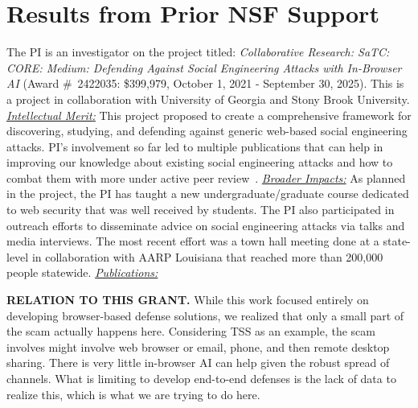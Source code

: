 \section{Results from Prior NSF Support}


The PI is an investigator on the project titled: \emph{Collaborative Research: SaTC: CORE: Medium: Defending Against Social Engineering Attacks with In-Browser AI} (Award \#~2422035: \$399,979, October 1, 2021 - September 30, 2025). 
This is a project in collaboration with University of Georgia and Stony Brook University. 
\underline{\emph{Intellectual Merit:}} This project proposed to create a comprehensive framework for discovering, studying, and defending against generic web-based social engineering attacks. PI's involvement so far led to multiple publications that can help in improving our knowledge about existing social engineering attacks and how to combat them with more under active peer review~\cite{ozen2024senet}. \underline{\emph{Broader Impacts:}} As planned in the project, the PI has taught a new undergraduate/graduate course dedicated to web security that was well received by students. The PI also participated in outreach efforts to disseminate advice on social engineering attacks via talks and media interviews. The most recent effort was a town hall meeting done at a state-level in collaboration with AARP Louisiana that reached more than 200,000 people statewide. \underline{\emph{Publications:}} ~\cite{LiuPVP23,SubramaniMSVP22,ChaliseNV22,AcharyaV22,honeytweets,cframe_oakland}


\textbf{RELATION TO THIS GRANT.} While this work focused entirely on developing browser-based defense solutions, we realized that only a small part of the scam actually happens here. Considering TSS as an example, the scam involves might involve web browser or email, phone, and then remote desktop sharing. There is very little in-browser AI can help given the robust spread of channels. What is limiting to develop end-to-end defenses is the lack of data to realize this, which is what we are trying to do here. 
